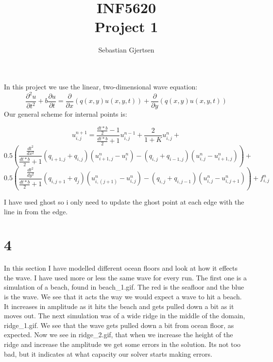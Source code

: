 \documentclass[a4paper,norsk]{article}
\begin{document}
\title{INF5620 \\ Project 1}
\author{Sebastian Gjertsen}

\maketitle
\section*{}
In this project we use the linear, two-dimensional wave equation:
$$\frac{\partial^2 u}{\partial t^2} + b \frac{\partial u}{\partial t} = \frac{\partial }{\partial x}(q(x,y)u(x,y,t)) + \frac{\partial }{\partial y}(q(x,y)u(x,y,t))  $$
Our general scheme for internal points is:



$$u_{i,j}^{n+1} = \frac{\frac{dt*b}{2}-1}{\frac{dt*b}{2}+1}u_{i,j}^{n-1} + \frac{2}{1+K}u_{i,j}^n + $$
$$0.5(\frac{\frac{dt^2}{dx^2}}{\frac{dt*b}{2}+1}(q_{i+1,j}+q_{i,j})(u_{i+1,j}^n-u_i^n) - (q_{i,j}+q_{i-1,j})(u_{i,j}^n - u_{i+1,j}^n)) + $$ 
$$0.5(\frac{\frac{dt^2}{dy^2}}{\frac{dt*b}{2}+1}(q_{i,j+1}+q_{j})(u_{i,(j+1)}^n-u_{i,j}^n) - (q_{i,j}+q_{i,j-1})(u_{i,j}^n - u_{i,j+1}^n)) +f_{i,j}^n $$

I have used ghost so i only need to update the ghost point at each edge with the line in from the edge.
\section*{4}
In this section I have modelled different ocean floors and look at how it effects the wave. I have used more or less the same wave for every run.
The first one is a simulation of a beach, found in beach_1.gif. The red is the seafloor and the blue is the wave. We see that it acts the way we would expect a wave to hit a beach. It increases in amplitude as it hits the beach and gets pulled down a bit as it moves out.
The next simulation was of a wide ridge in the middle of the domain, ridge_1.gif. We see that the wave gets pulled down a bit from ocean floor, as expected. Now we see in ridge_2.gif, that when we increase the height of the ridge and increase the amplitude we get some errors in the solution. Its not too bad, but it indicates at what capacity our solver starts making errors.
\end{document}
